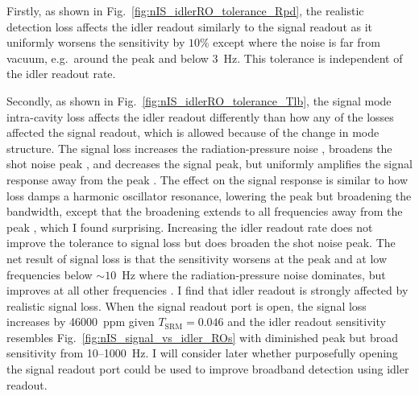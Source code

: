 Firstly, as shown in Fig.~\ref{fig:nIS_idlerRO_tolerance_Rpd}, the realistic detection loss affects the idler readout similarly to the signal readout as it uniformly worsens the sensitivity by $10\%$ except where the noise is far from vacuum, e.g.\ around the peak and below 3~Hz. %
This tolerance is independent of the idler readout rate. %

Secondly, as shown in Fig.~\ref{fig:nIS_idlerRO_tolerance_Tlb}, the signal mode intra-cavity loss affects the idler readout differently than how any of the losses affected the signal readout, which is allowed because of the change in mode structure. The signal loss increases the radiation-pressure noise , broadens the shot noise peak , and decreases the signal peak, but uniformly amplifies the signal response away from the peak . The effect on the signal response is similar to how loss damps a harmonic oscillator resonance, lowering the peak but broadening the bandwidth, except that the broadening extends to all frequencies away from the peak , which I found surprising. Increasing the idler readout rate does not improve the tolerance to signal loss but does broaden the shot noise peak. The net result of signal loss is that the sensitivity worsens at the peak and at low frequencies below $\sim10$~Hz where the radiation-pressure noise dominates, but improves at all other frequencies . I find that idler readout is strongly affected by realistic signal loss. When the signal readout port is open, the signal loss increases by 46000~ppm given $T_\text{SRM}=0.046$ and the idler readout sensitivity resembles Fig.~\ref{fig:nIS_signal_vs_idler_ROs} with diminished peak but broad sensitivity from 10--1000~Hz. I will consider later whether purposefully opening the signal readout port could be used to improve broadband detection using idler readout. %

